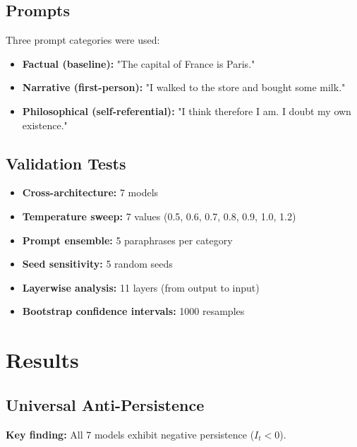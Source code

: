 \documentclass[12pt,a4paper]{article}
\begin{document}
\subsection{Prompts}

Three prompt categories were used:

\begin{itemize}[noitemsep]
    \item \textbf{Factual (baseline):} "The capital of France is Paris."
    \item \textbf{Narrative (first-person):} "I walked to the store and bought some milk."
    \item \textbf{Philosophical (self-referential):} "I think therefore I am. I doubt my own existence."
\end{itemize}

\subsection{Validation Tests}

\begin{itemize}[noitemsep]
    \item \textbf{Cross-architecture:} 7 models
    \item \textbf{Temperature sweep:} 7 values (0.5, 0.6, 0.7, 0.8, 0.9, 1.0, 1.2)
    \item \textbf{Prompt ensemble:} 5 paraphrases per category
    \item \textbf{Seed sensitivity:} 5 random seeds
    \item \textbf{Layerwise analysis:} 11 layers (from output to input)
    \item \textbf{Bootstrap confidence intervals:} 1000 resamples
\end{itemize}

\section{Results}

\subsection{Universal Anti-Persistence}

\textbf{Key finding:} All 7 models exhibit negative persistence ($I_t < 0$).
\end{document}
